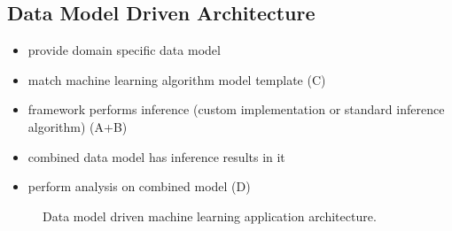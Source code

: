 \subsection{Data Model Driven Architecture}

\begin{itemize}
\item provide domain specific data model
\item match machine learning algorithm model template (C)
\item framework performs inference (custom implementation or standard inference algorithm) (A+B)
\item combined data model has inference results in it
\item perform analysis on combined model (D)
\end{itemize}

\begin{figure}
\centering
\scalebox{\tikzScale}{\adjustTikzSize }
\caption{Data model driven machine learning application architecture.}\label{fig:ml-application-architecture-dm}
\end{figure}
